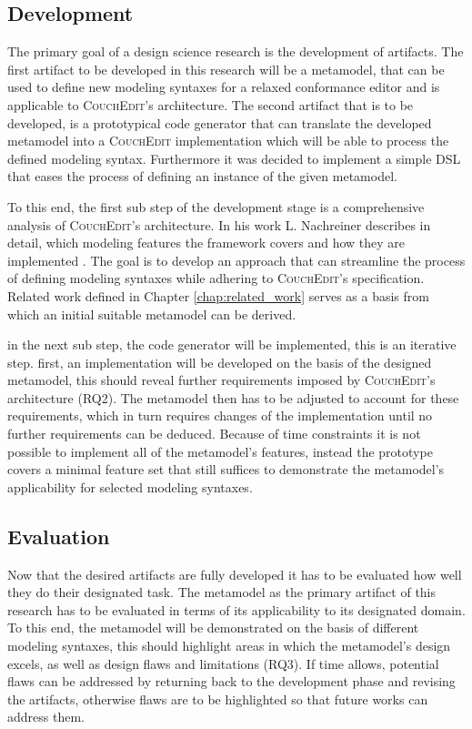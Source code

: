 \subsection{Development}
The primary goal of a design science research is the development of artifacts.
The first artifact to be developed in this research will be a metamodel, that can be used to define new modeling syntaxes for a relaxed conformance editor and is applicable to \textsc{CouchEdit}'s architecture. The second artifact that is to be developed, is a prototypical code generator that can translate the developed metamodel into a \textsc{CouchEdit} implementation which will be able to process the defined modeling syntax. Furthermore it was decided to implement a simple DSL that eases the process of defining an instance of the given metamodel.

To this end, the first sub step of the development stage is a comprehensive analysis of \textsc{CouchEdit}'s architecture. In his work L. Nachreiner describes in detail, which modeling features the framework covers and how they are implemented \cite{nachreiner_couchedit_2020}. The goal is to develop an approach that can streamline the process of defining modeling syntaxes while adhering to \textsc{CouchEdit}'s specification. Related work defined in Chapter \ref{chap:related_work} serves as a basis from which an initial suitable metamodel can be derived.

in the next sub step, the code generator will be implemented, this is an iterative step. first, an implementation will be developed on the basis of the designed metamodel, this should reveal further requirements imposed by \textsc{CouchEdit}'s architecture (RQ2). The metamodel then has to be adjusted to account for these requirements, which in turn requires changes of the implementation until no further requirements can be deduced. Because of time constraints it is not possible to implement all of the metamodel's features, instead the prototype covers a minimal feature set that still suffices to demonstrate the metamodel's applicability for selected modeling syntaxes.

\subsection{Evaluation}
Now that the desired artifacts are fully developed it has to be evaluated how well they do their designated task. The metamodel as the primary artifact of this research has to be evaluated in terms of its applicability to its designated domain. To this end, the metamodel will be demonstrated on the basis of different modeling syntaxes, this should highlight areas in which the metamodel's design excels, as well as design flaws and limitations (RQ3). If time allows, potential flaws can be addressed by returning back to the development phase and revising the artifacts, otherwise flaws are to be highlighted so that future works can address them.

